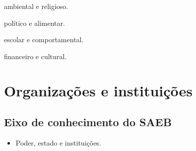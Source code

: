 \begin{minipage}{.5\textwidth}
\begin{escolha}
\item ambiental e religioso.

\item político e alimentar.

\item escolar e comportamental.

\item financeiro e cultural.
\end{escolha}
\end{minipage}

\chapter{Organizações e instituições}


\section{Eixo de conhecimento do SAEB}

\begin{itemize}
\item Poder, estado e instituições.
\end{itemize}


